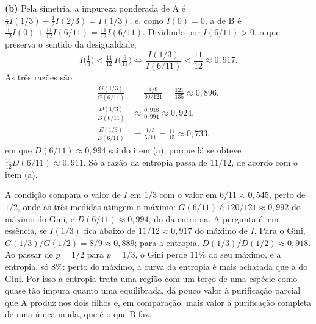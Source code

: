 \begin{solucao}
\smallskip
\textbf{(b)} Pela simetria, a impureza ponderada de A é
$\tfrac12I(1/3)+\tfrac12I(2/3)=I(1/3)$, e, como $I(0)=0$, a de B é
$\tfrac1{12}I(0)+\tfrac{11}{12}I(6/11)=\tfrac{11}{12}I(6/11)$. Dividindo por $I(6/11)>0$, o que
preserva o sentido da desigualdade,
\[
  I\big(\tfrac13\big)<\tfrac{11}{12}\,I\big(\tfrac6{11}\big)
  \iff \frac{I(1/3)}{I(6/11)}<\frac{11}{12}\approx0{,}917 .
\]
As três razões são
\begin{align*}
  \frac{G(1/3)}{G(6/11)}&=\frac{4/9}{60/121}=\frac{121}{135}\approx0{,}896,\\
  \frac{D(1/3)}{D(6/11)}&\approx\frac{0{,}918}{0{,}994}\approx0{,}924,\\
  \frac{E(1/3)}{E(6/11)}&=\frac{1/3}{5/11}=\frac{11}{15}\approx0{,}733,
\end{align*}
em que $D(6/11)\approx0{,}994$ sai do item (a), porque lá se obteve
$\tfrac{11}{12}D(6/11)\approx0{,}911$. Só a razão da entropia passa de $11/12$, de acordo com o
item (a).

A condição compara o valor de $I$ em $1/3$ com o valor em $6/11\approx0{,}545$, perto de $1/2$,
onde as três medidas atingem o máximo: $G(6/11)$ é $120/121\approx0{,}992$ do máximo do Gini, e
$D(6/11)\approx0{,}994$, do da entropia. A pergunta é, em essência, se $I(1/3)$ fica abaixo de
$11/12\approx0{,}917$ do máximo de $I$. Para o Gini, $G(1/3)/G(1/2)=8/9\approx0{,}889$; para a
entropia, $D(1/3)/D(1/2)\approx0{,}918$. Ao passar de $p=1/2$ para $p=1/3$, o Gini perde $11\%$
do seu máximo, e a entropia, só $8\%$: perto do máximo, a curva da entropia é mais achatada que a
do Gini. Por isso a entropia trata uma região com um terço de uma espécie como quase tão impura
quanto uma equilibrada, dá pouco valor à purificação parcial que A produz nos dois filhos e, em
comparação, mais valor à purificação completa de uma única muda, que é o que B faz.
\end{solucao}
